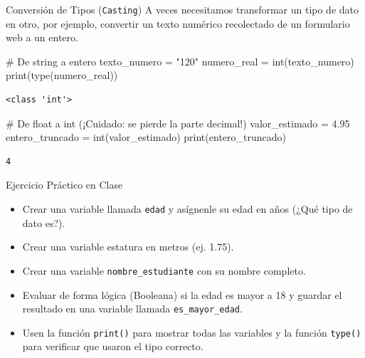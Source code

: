 \documentclass[
  ignorenonframetext,
  aspectratio=169,
  spanish,
]{beamer}
\newenvironment{Shaded}{\begin{snugshade}}{\end{snugshade}}
\newcommand{\BuiltInTok}[1]{\textcolor[rgb]{0.00,0.23,0.31}{#1}}
\newcommand{\CommentTok}[1]{\textcolor[rgb]{0.37,0.37,0.37}{#1}}
\newcommand{\FloatTok}[1]{\textcolor[rgb]{0.68,0.00,0.00}{#1}}
\newcommand{\NormalTok}[1]{\textcolor[rgb]{0.00,0.23,0.31}{#1}}
\newcommand{\OperatorTok}[1]{\textcolor[rgb]{0.37,0.37,0.37}{#1}}
\newcommand{\StringTok}[1]{\textcolor[rgb]{0.13,0.47,0.30}{#1}}
\begin{document}
\begin{frame}[fragile]{Conversión de Tipos (\texttt{Casting})}
\label{conversiuxf3n-de-tipos-casting}
A veces necesitamos transformar un tipo de dato en otro, por ejemplo,
convertir un texto numérico recolectado de un formulario web a un
entero.

\begin{Shaded}
\begin{Highlighting}[]
\CommentTok{\# De string a entero}
\NormalTok{texto\_numero }\OperatorTok{=} \StringTok{"120"}
\NormalTok{numero\_real }\OperatorTok{=} \BuiltInTok{int}\NormalTok{(texto\_numero)}
\BuiltInTok{print}\NormalTok{(}\BuiltInTok{type}\NormalTok{(numero\_real))}
\end{Highlighting}
\end{Shaded}

\begin{verbatim}
<class 'int'>
\end{verbatim}

\begin{Shaded}
\begin{Highlighting}[]
\CommentTok{\# De float a int (¡Cuidado: se pierde la parte decimal!)}
\NormalTok{valor\_estimado }\OperatorTok{=} \FloatTok{4.95}
\NormalTok{entero\_truncado }\OperatorTok{=} \BuiltInTok{int}\NormalTok{(valor\_estimado)}
\BuiltInTok{print}\NormalTok{(entero\_truncado)}
\end{Highlighting}
\end{Shaded}

\begin{verbatim}
4
\end{verbatim}
\end{frame}

\begin{frame}[fragile]{Ejercicio Práctico en Clase}
\label{ejercicio-pruxe1ctico-en-clase}
\begin{itemize}
\item
  Crear una variable llamada \texttt{edad} y asígnenle su edad en años
  (¿Qué tipo de dato es?).
\item
  Crear una variable estatura en metros (ej. 1.75).
\item
  Crear una variable \texttt{nombre\_estudiante} con su nombre completo.
\item
  Evaluar de forma lógica (Booleana) si la edad es mayor a 18 y guardar
  el resultado en una variable llamada \texttt{es\_mayor\_edad}.
\item
  Usen la función \texttt{print()} para mostrar todas las variables y la
  función \texttt{type()} para verificar que usaron el tipo correcto.
\end{itemize}
\end{frame}
\end{document}
